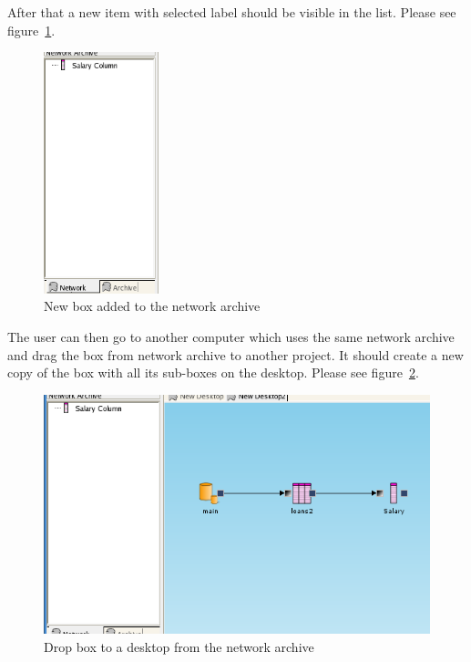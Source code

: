 \documentclass[a4paper,12pt]{book}
\begin{document}
After that a new item with selected label should be visible in the list. Please see figure~\ref{fig:addedToNA}.
\begin{figure}
	\centering
	\includegraphics[height=7cm]{network_archive_box_added}
	\caption{New box added to the network archive}
	\label{fig:addedToNA}
\end{figure}

The user can then go to another computer which uses the same network archive and drag the box from network archive to another project. It should create a new copy of the box with all its sub-boxes on the desktop. Please see figure~\ref{fig:dragFromNAToDesktop}.
\begin{figure}
	\includegraphics[width=1\textwidth]{network_archive_drop_to_desktop}
	\caption{Drop box to a desktop from the network archive}
	\label{fig:dragFromNAToDesktop}
\end{figure}
\end{document}
